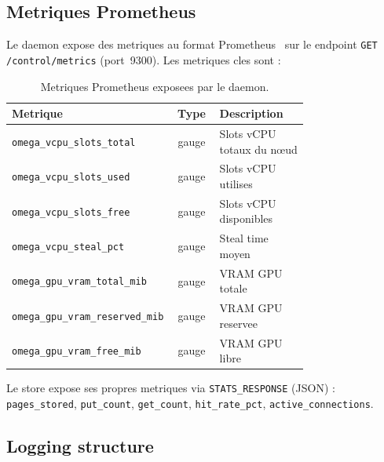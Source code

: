 \subsection{Metriques Prometheus}
\label{subsec:metriques-prometheus}

Le daemon expose des metriques au format Prometheus~\cite{prometheus_doc} sur le endpoint \texttt{GET /control/metrics} (port~9300). Les metriques cles sont :

\begin{table}[htbp]
    \centering
    \caption{Metriques Prometheus exposees par le daemon.}
    \label{tab:metriques-prometheus}
    \begin{tabular}{p{0.45\linewidth} c p{0.30\linewidth}}
        \toprule
        \textbf{Metrique} & \textbf{Type} & \textbf{Description} \\
        \midrule
        \texttt{omega\_vcpu\_slots\_total} & gauge & Slots vCPU totaux du nœud \\
        \texttt{omega\_vcpu\_slots\_used} & gauge & Slots vCPU utilises \\
        \texttt{omega\_vcpu\_slots\_free} & gauge & Slots vCPU disponibles \\
        \texttt{omega\_vcpu\_steal\_pct} & gauge & Steal time moyen \\
        \texttt{omega\_gpu\_vram\_total\_mib} & gauge & VRAM GPU totale \\
        \texttt{omega\_gpu\_vram\_reserved\_mib} & gauge & VRAM GPU reservee \\
        \texttt{omega\_gpu\_vram\_free\_mib} & gauge & VRAM GPU libre \\
        \bottomrule
    \end{tabular}
\end{table}

Le store expose ses propres metriques via \texttt{STATS\_RESPONSE} (JSON) : \texttt{pages\_stored}, \texttt{put\_count}, \texttt{get\_count}, \texttt{hit\_rate\_pct}, \texttt{active\_connections}.

\subsection{Logging structure}
\label{subsec:logging-structure}

